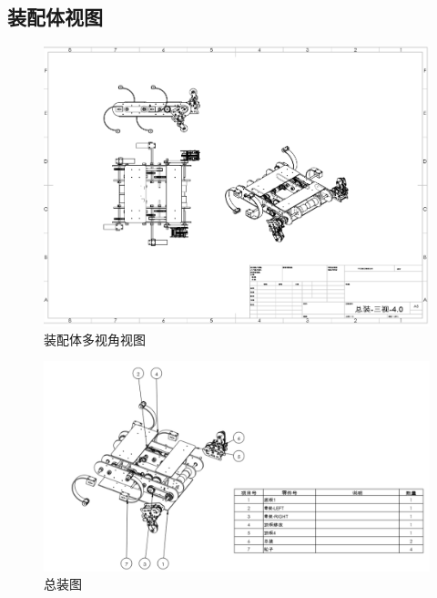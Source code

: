 \documentclass[12pt]{article}
\begin{document}
\begin{CJK}{UTF8}{gbsn}
\subsection{装配体视图}
 \begin{figure}[H]
\centering
\includegraphics[width=.81\textwidth]{chap6//fig1.png}
\caption{装配体多视角视图}
\end{figure}
 \begin{figure}[H]
\centering
\includegraphics[width=.85\textwidth]{chap6//fig2.png}
\caption{总装图}
\end{figure}

\end{CJK}
\end{document}
